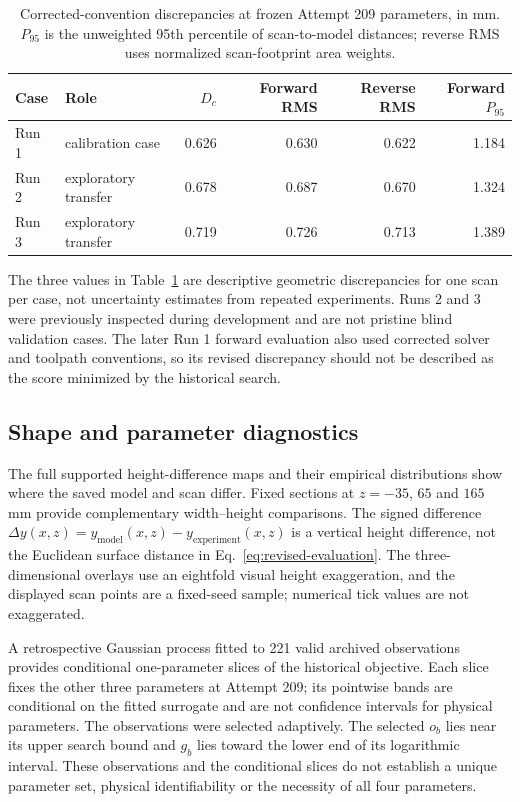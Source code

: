 \documentclass[11pt]{article}
\begin{document}
\begin{table}[ht]
\centering
\caption{Corrected-convention discrepancies at frozen Attempt 209 parameters, in mm. $P_{95}$ is the unweighted 95th percentile of scan-to-model distances; reverse RMS uses normalized scan-footprint area weights.}
\label{tab:attempt209-fit}
\begin{tabular}{llrrrr}\toprule
Case & Role & $D_c$ & Forward RMS & Reverse RMS & Forward $P_{95}$ \\\midrule
Run 1 & calibration case & 0.626 & 0.630 & 0.622 & 1.184 \\
Run 2 & exploratory transfer & 0.678 & 0.687 & 0.670 & 1.324 \\
Run 3 & exploratory transfer & 0.719 & 0.726 & 0.713 & 1.389 \\\bottomrule
\end{tabular}
\end{table}

The three values in Table~\ref{tab:attempt209-fit} are descriptive geometric discrepancies for one scan per case, not uncertainty estimates from repeated experiments. Runs 2 and 3 were previously inspected during development and are not pristine blind validation cases. The later Run 1 forward evaluation also used corrected solver and toolpath conventions, so its revised discrepancy should not be described as the score minimized by the historical search.

\subsection{Shape and parameter diagnostics}
The full supported height-difference maps and their empirical distributions show where the saved model and scan differ. Fixed sections at $z=-35$, $65$ and $165$ mm provide complementary width--height comparisons. The signed difference $\Delta y(x,z)=y_{\mathrm{model}}(x,z)-y_{\mathrm{experiment}}(x,z)$ is a vertical height difference, not the Euclidean surface distance in Eq.~\eqref{eq:revised-evaluation}. The three-dimensional overlays use an eightfold visual height exaggeration, and the displayed scan points are a fixed-seed sample; numerical tick values are not exaggerated.

A retrospective Gaussian process fitted to 221 valid archived observations provides conditional one-parameter slices of the historical objective. Each slice fixes the other three parameters at Attempt 209; its pointwise bands are conditional on the fitted surrogate and are not confidence intervals for physical parameters. The observations were selected adaptively. The selected $o_b$ lies near its upper search bound and $g_b$ lies toward the lower end of its logarithmic interval. These observations and the conditional slices do not establish a unique parameter set, physical identifiability or the necessity of all four parameters.
\end{document}
